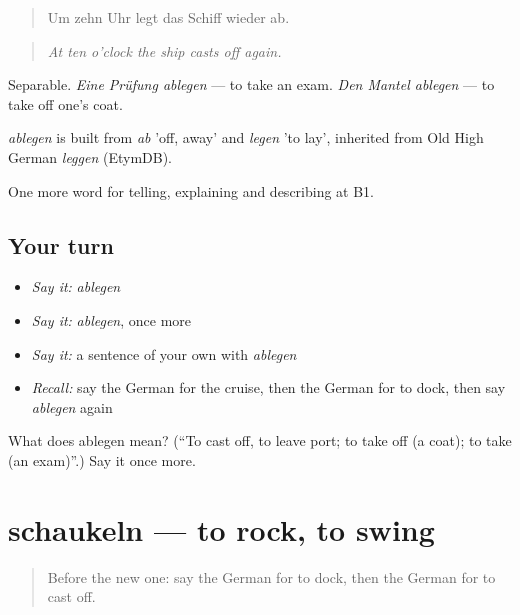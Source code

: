 \begin{quote}
Um zehn Uhr legt das Schiff wieder ab.
\end{quote}

\begin{quote}
\emph{At ten o'clock the ship casts off again.}
\end{quote}

Separable. \emph{Eine Prüfung ablegen} — to take an exam. \emph{Den Mantel ablegen} — to take off one's coat.

\begin{cousinweb}
\emph{ablegen} is built from \emph{ab} 'off, away' and \emph{legen} 'to lay', inherited from Old High German \emph{leggen} (EtymDB).
\end{cousinweb}

\begin{grammarlens}[title={What you've built}]
One more word for telling, explaining and describing at B1.
\end{grammarlens}

\subsection*{Your turn}
\begin{itemize}
\raggedright
  \item \emph{Say it:} \emph{ablegen}
  \item \emph{Say it:} \emph{ablegen}, once more
  \item \emph{Say it:} a sentence of your own with \emph{ablegen}
  \item \emph{Recall:} say the German for the cruise, then the German for to dock, then say \emph{ablegen} again
\end{itemize}

\begin{tcolorbox}[breakable,colback=teal!4,colframe=teal!35!black,title={Before you move on}]
What does ablegen mean? (\textquotedblleft{}To cast off, to leave port; to take off (a coat); to take (an exam)\textquotedblright{}.) Say it once more.
\end{tcolorbox}
\section[schaukeln]{schaukeln — to rock, to swing}

\label{lesson:GE-C422-schaukeln}



\begin{quote}
Before the new one: say the German for to dock, then the German for to cast off.
\end{quote}

